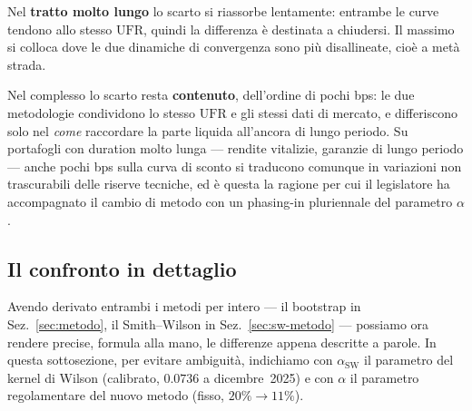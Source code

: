 \documentclass[11pt,a4paper]{article}
\theoremstyle{plain}
\theoremstyle{definition}
\theoremstyle{remark}
\newcommand{\UFR}{\mathrm{UFR}}
\newcommand{\alphaSW}{\alpha_{\mathrm{SW}}}
\begin{document}
Nel \textbf{tratto molto lungo} lo scarto si riassorbe lentamente: entrambe le curve tendono
allo stesso $\UFR$, quindi la differenza \`e destinata a chiudersi. Il massimo si colloca dove
le due dinamiche di convergenza sono pi\`u disallineate, cio\`e a met\`a strada.

Nel complesso lo scarto resta \textbf{contenuto}, dell'ordine di pochi bps: le due metodologie
condividono lo stesso $\UFR$ e gli stessi dati di mercato, e differiscono solo nel \emph{come}
raccordare la parte liquida all'ancora di lungo periodo. Su portafogli con duration molto
lunga --- rendite vitalizie, garanzie di lungo periodo --- anche pochi bps sulla curva di
sconto si traducono comunque in variazioni non trascurabili delle riserve tecniche, ed \`e
questa la ragione per cui il legislatore ha accompagnato il cambio di metodo con un phasing-in
pluriennale del parametro $\alpha$.

\subsection{Il confronto in dettaglio}
\label{sec:confronto-teorico}

Avendo derivato entrambi i metodi per intero --- il bootstrap in Sez.~\ref{sec:metodo}, il
Smith--Wilson in Sez.~\ref{sec:sw-metodo} --- possiamo ora rendere precise, formula alla mano,
le differenze appena descritte a parole. In questa sottosezione, per evitare ambiguit\`a,
indichiamo con $\alphaSW$ il parametro del kernel di Wilson (calibrato, $0.0736$ a
dicembre~2025) e con $\alpha$ il parametro regolamentare del nuovo metodo (fisso,
$20\%\to11\%$).
\end{document}
